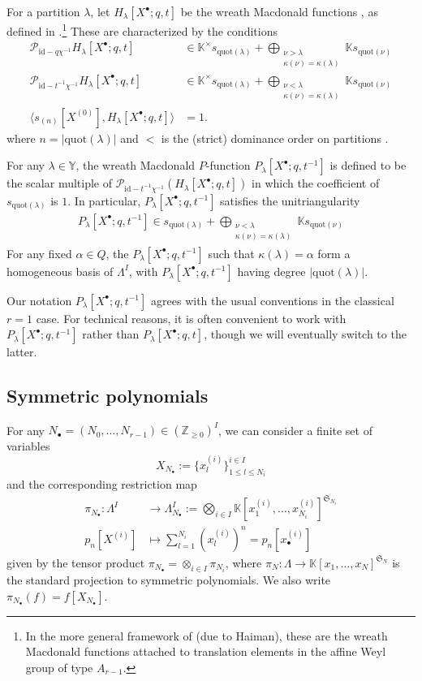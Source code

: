 \documentclass{amsart}
\newcommand{\Z}{\mathbb{Z}}
\newcommand{\K}{\mathbb{K}}
\newcommand{\Y}{\mathbb{Y}}
\newcommand{\cP}{\mathcal{P}}
\newcommand{\kb}{\kappa}
\newcommand{\la}{\lambda}
\newcommand{\Xd}{X^\bullet}
\newcommand{\id}{\mathrm{id}}
\newcommand{\quot}{\mathrm{quot}}
\newcommand{\fS}{\mathfrak{S}}
\theoremstyle{remark}
\numberwithin{thm}{section}
\numberwithin{equation}{section}
\begin{document}
For a partition $\lambda$, let $H_\lambda[\Xd;q,t]$ be the wreath Macdonald functions \cite[Conjecture 7.2.19]{H2}, as defined in \cite[\S 2.3]{Wen}.\footnote{In the more general framework of \cite{OS2} (due to Haiman), these are the wreath Macdonald functions attached to translation elements in the affine Weyl group of type $A_{r-1}$.} These are characterized by the conditions
\begin{align}
\cP_{\id-q\chi^{-1}}H_\lambda[\Xd;q,t] &\in \K^\times s_{\quot(\lambda)} + \bigoplus_{\substack{\nu>\la\\\kb(\nu)=\kb(\la)}} \K s_{\quot(\nu)}\\
\cP_{\id-t^{-1}\chi^{-1}}H_\lambda[\Xd;q,t] &\in \K^\times s_{\quot(\lambda)} + \bigoplus_{\substack{\nu<\la\\\kb(\nu)=\kb(\la)}} \K s_{\quot(\nu)}\\
\langle s_{(n)}[X^{(0)}], H_\lambda[\Xd;q,t]\rangle &= 1.
\end{align}
where $n=|\quot(\lambda)|$ and $<$ is the (strict) dominance order on partitions \cite[\S I.1]{Mac}.

For any $\lambda\in\Y$, the wreath Macdonald $P$-function $P_\lambda[\Xd;q,t^{-1}]$ is defined to be the scalar multiple of $\cP_{\id-t^{-1}\chi^{-1}}(H_\lambda[\Xd;q,t])$ in which the coefficient of $s_{\quot(\lambda)}$ is $1$. In particular, $P_\lambda[\Xd;q,t^{-1}]$ satisfies the unitriangularity
\begin{align*}
P_\lambda[\Xd;q,t^{-1}]\in s_{\quot(\lambda)} + \bigoplus_{\substack{\nu<\la\\\kb(\nu)=\kb(\la)}} \K s_{\quot(\nu)}
\end{align*}
For any fixed $\alpha\in Q$, the $P_\lambda[\Xd;q,t^{-1}]$ such that $\kb(\lambda)=\alpha$ form a homogeneous basis of $\Lambda^I$, with $P_\lambda[\Xd;q,t^{-1}]$ having degree $|\quot(\lambda)|$. 

Our notation $P_\lambda[\Xd;q,t^{-1}]$ agrees with the usual conventions in the classical $r=1$ case. For technical reasons, it is often convenient to work with $P_\lambda[\Xd;q,t^{-1}]$ rather than $P_\lambda[\Xd;q,t]$, though we will eventually switch to the latter.

\subsection{Symmetric polynomials}
For any $N_\bullet=(N_0,\ldots, N_{r-1})\in\left( \Z_{\ge 0} \right)^I$, we can consider a finite set of variables 
\[
X_{N_\bullet}:=
\{x_{l}^{(i)}\}^{i\in I}_{1\le l\le N_i}
\]
and the corresponding restriction map
\begin{align}\label{E:to pol}
\pi_{N_\bullet} : \Lambda^I &\to \Lambda^I_{N_\bullet}:=\bigotimes_{i\in I} \K\left[x_{1}^{(i)},\dotsc,x_{N_i}^{(i)}\right]^{\fS_{N_i}} \\
\nonumber
p_n[X^{(i)}]&\mapsto \sum_{l=1}^{N_i}\left(x_{l}^{(i)}\right)^n=p_n[x_\bullet^{(i)}]
\end{align}
given by the tensor product $\pi_{N_\bullet} = \otimes_{i\in I} \pi_{N_i}$, where $\pi_N : \Lambda\to\K[x_1,\dotsc,x_N]^{\fS_N}$ is the standard projection to symmetric polynomials. 
We also write $\pi_{N_\bullet}(f)=f[X_{N_\bullet}]$.
\end{document}
